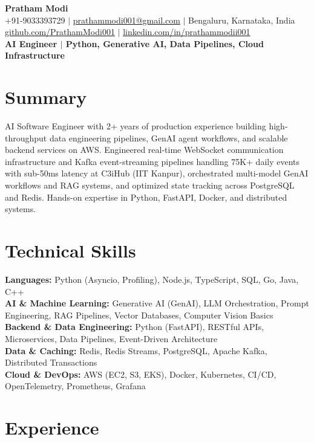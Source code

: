\documentclass[10pt]{article}
\begin{document}
\begin{center}
{\Huge \textbf{Pratham Modi}} \\[2pt]
+91-9033393729 $\vert$ \href{mailto:prathammodi001@gmail.com}{prathammodi001@gmail.com} $\vert$ Bengaluru, Karnataka, India \\[1pt]
\href{https://github.com/PrathamModi001}{github.com/PrathamModi001} $\vert$ \href{https://www.linkedin.com/in/prathammodii001/}{linkedin.com/in/prathammodii001} \\[2pt]
\textbf{AI Engineer $\vert$ Python, Generative AI, Data Pipelines, Cloud Infrastructure}
\end{center}

\vspace{-6pt}
\section{Summary}
AI Software Engineer with 2+ years of production experience building high-throughput data engineering pipelines, GenAI agent workflows, and scalable backend services on AWS. Engineered real-time WebSocket communication infrastructure and Kafka event-streaming pipelines handling 75K+ daily events with sub-50ms latency at C3iHub (IIT Kanpur), orchestrated multi-model GenAI workflows and RAG systems, and optimized state tracking across PostgreSQL and Redis. Hands-on expertise in Python, FastAPI, Docker, and distributed systems.

\section{Technical Skills}
\textbf{Languages:} Python (Asyncio, Profiling), Node.js, TypeScript, SQL, Go, Java, C++ \\
\textbf{AI \& Machine Learning:} Generative AI (GenAI), LLM Orchestration, Prompt Engineering, RAG Pipelines, Vector Databases, Computer Vision Basics \\
\textbf{Backend \& Data Engineering:} Python (FastAPI), RESTful APIs, Microservices, Data Pipelines, Event-Driven Architecture \\
\textbf{Data \& Caching:} Redis, Redis Streams, PostgreSQL, Apache Kafka, Distributed Transactions \\
\textbf{Cloud \& DevOps:} AWS (EC2, S3, EKS), Docker, Kubernetes, CI/CD, OpenTelemetry, Prometheus, Grafana

\section{Experience}
\end{document}
